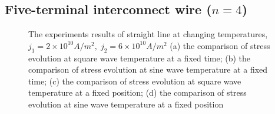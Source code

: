 \subsection{Five-terminal interconnect wire ($n=4$)}
\begin{figure}[!h]
\centering
{}
\caption{The experiments results of straight line at changing temperatures, $j_1=2\times10^{10}A/m^2,\;j_2=6\times10^{10}A/m^2$ (a) the comparison of stress evolution at square wave temperature at a fixed time; (b) the comparison of stress evolution at sine wave temperature at a fixed time; (c) the comparison of stress evolution at square wave temperature at a fixed position; (d) the comparison of stress evolution at sine wave temperature at a fixed position}
\label{fig:S4Results1}
\end{figure}


